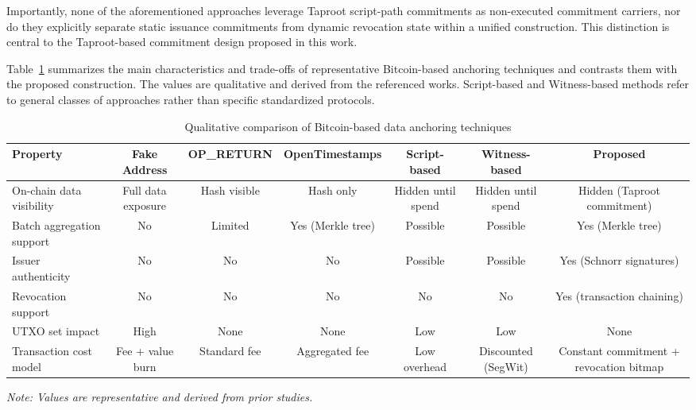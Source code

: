 \documentclass{ieeeaccess}
\begin{document}
Importantly, none of the aforementioned approaches leverage Taproot script-path commitments as non-executed commitment carriers, nor do they explicitly separate static issuance commitments from dynamic revocation state within a unified construction.
This distinction is central to the Taproot-based commitment design proposed in this work.

Table~\ref{tab:comparativeBitcoin} summarizes the main characteristics and trade-offs of representative Bitcoin-based anchoring techniques and contrasts them with the proposed construction.
The values are qualitative and derived from the referenced works.
Script-based and Witness-based methods refer to general classes of approaches rather than specific standardized protocols.

\begin{table}[t]
\centering
\caption{Qualitative comparison of Bitcoin-based data anchoring techniques}
\label{tab:comparativeBitcoin}
\begin{tabular}{lcccccc}
\toprule
\textbf{Property} 
& \textbf{Fake Address} 
& \textbf{OP\_RETURN} 
& \textbf{OpenTimestamps} 
& \textbf{Script-based} 
& \textbf{Witness-based} 
& \textbf{Proposed} \\
\midrule
On-chain data visibility 
& Full data exposure 
& Hash visible 
& Hash only 
& Hidden until spend 
& Hidden until spend 
& Hidden (Taproot commitment) \\

Batch aggregation support 
& No 
& Limited 
& Yes (Merkle tree) 
& Possible 
& Possible 
& Yes (Merkle tree) \\

Issuer authenticity 
& No 
& No 
& No 
& Possible 
& Possible 
& Yes (Schnorr signatures) \\

Revocation support 
& No 
& No 
& No 
& No 
& No 
& Yes (transaction chaining) \\

UTXO set impact 
& High 
& None 
& None 
& Low 
& Low 
& None \\

Transaction cost model 
& Fee + value burn 
& Standard fee 
& Aggregated fee 
& Low overhead 
& Discounted (SegWit) 
& Constant commitment + revocation bitmap \\
\bottomrule
\end{tabular}

\vspace{0.5em}
\footnotesize
\textit{Note: Values are representative and derived from prior studies.}
\end{table}
\end{document}
